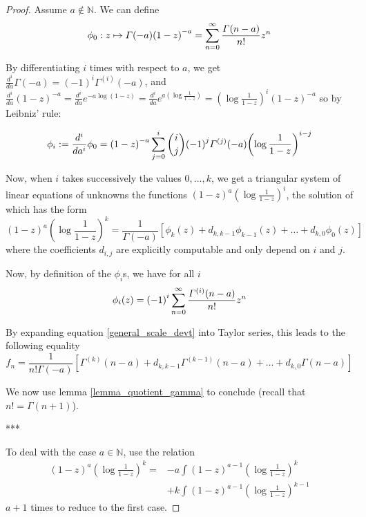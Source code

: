 \documentclass[../main.tex]{subfiles}
\begin{document}
\begin{proof}
	Assume $a \not\in \mathbb{N}$. We can define
	$$\phi_0 : z \mapsto \Gamma(-a) {(1 - z)}^{-a}
	= \sum\limits_{n = 0}^\infty \frac{\Gamma(n - a)}{n!} z^n$$
	
	By differentiating $i$ times with respect to $a$, we get $\frac{d^i}{da} \Gamma(-a) = {(-1)}^i \Gamma^{(i)}(-a)$, and
	$\frac{d^i}{da} {(1 - z)}^{-a}
	= \frac{d^i}{da} e^{-a \log(1-z)}
	= \frac{d^i}{da} e^{a \left(\log \frac{1}{1-z}\right)}
	={\left(\log \frac{1}{1-z}\right)}^i {(1 - z)}^{-a}$
	so by Leibniz' rule:
	
	\begin{equation*}
	\phi_i := \frac{d^i}{da^i} \phi_0 =
	{(1 - z)}^{-a} \sum\limits_{j = 0}^i {i \choose j} {(-1)}^j \Gamma^{(j)}(-a) {\left(\log \frac{1}{1-z}\right)}^{i-j}
	\end{equation*}
	
	Now, when $i$ takes successively the values $0, \dots, k$, we get a triangular system of linear equations of unknowns the functions ${(1-z)}^{a} {\left(\log \frac{1}{1-z}\right)}^i$, the solution of which has the form
	\begin{equation}\label{general_scale_devt}
	{(1-z)}^{a} {\left(\log \frac{1}{1-z}\right)}^k
	= \frac{1}{\Gamma(-a)} \left[ \phi_k(z) + d_{k, k - 1} \phi_{k-1}(z) + \dots + d_{k, 0} \phi_0(z) \right]
	\end{equation}
	where the coefficients $d_{i, j}$ are explicitly computable and only depend on $i$ and $j$.
	
	Now, by definition of the $\phi_i$s, we have for all $i$
	\[
	\phi_i(z) = {(-1)}^i \sum\limits_{n = 0}^\infty \frac{\Gamma^{(i)}(n - a)}{n!} z^n
	\]
	
	By expanding equation \eqref{general_scale_devt} into Taylor series, this leads to the following equality
	\[
	f_n = \frac{1}{n! \Gamma(-a)} \left[
	\Gamma^{(k)}(n - a) + d_{k, k-1} \Gamma^{(k-1)}(n - a)
	+ \dots + d_{k, 0} \Gamma(n - a)
	\right]
	\]
	
	We now use lemma \ref{lemma_quotient_gamma} to conclude (recall that $n! = \Gamma(n + 1)$).
	
	\begin{center}
		***
	\end{center}
	
	To deal with the case $a \in \mathbb{N}$, use the relation
	\begin{align*}
	{(1 - z)}^a {\left(\log \frac{1}{1 - z}\right)}^k
	= &-a \int {(1 - z)}^{a - 1} {\left(\log \frac{1}{1 - z}\right)}^k\\
	&+ k \int {(1 - z)}^{a - 1} {\left(\log \frac{1}{1 - z}\right)}^{k - 1}
	\end{align*}
	$a + 1$ times to reduce to the first case.
\end{proof}
\end{document}

